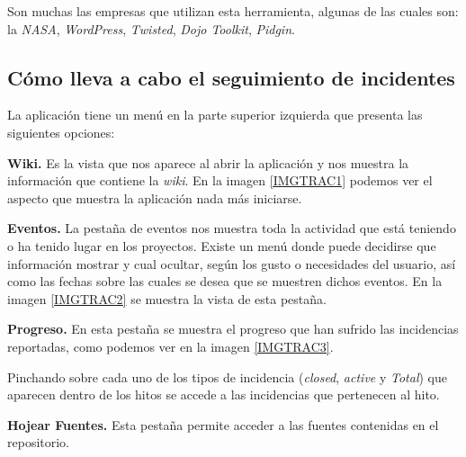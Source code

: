 \documentclass[11pt,a4paper,spanish,twoside]{report}
\begin{document}
        Son muchas las empresas que utilizan esta herramienta, algunas de las
        cuales son: la \emph{NASA}, \emph{WordPress}, \emph{Twisted},
        \emph{Dojo Toolkit}, \emph{Pidgin}. 

	\subsection{Cómo lleva a cabo el seguimiento de incidentes}

        La aplicación tiene un menú en la parte superior izquierda que
        presenta las siguientes opciones:
        \begin{description}
          \item \textbf{Wiki.} Es la vista que nos aparece al abrir
            la aplicación y nos muestra la información que contiene la
            \emph{wiki}. En la imagen \ref{IMGTRAC1} podemos ver el aspecto
            que muestra la aplicación nada más iniciarse.


          \item \textbf{Eventos.} La pestaña de eventos nos muestra toda la
            actividad que está teniendo o ha tenido lugar en los
            proyectos. Existe un menú donde puede decidirse que información
            mostrar y cual ocultar, según los gusto o necesidades del
            usuario, así como las fechas sobre las cuales se desea que se
            muestren dichos eventos. En la imagen \ref{IMGTRAC2} se muestra la
            vista de esta pestaña.


          \item \textbf{Progreso.} En esta pestaña se muestra el progreso que
            han sufrido las incidencias reportadas, como podemos ver en la
            imagen \ref{IMGTRAC3}. 

            
            Pinchando sobre cada uno de los tipos de incidencia
            (\emph{closed}, \emph{active} y \emph{Total}) que aparecen dentro
            de los hitos se accede a las incidencias que pertenecen al hito.

          \item \textbf{Hojear Fuentes.} Esta pestaña permite acceder a las
            fuentes contenidas en el repositorio.


\end{description}
\end{document}
